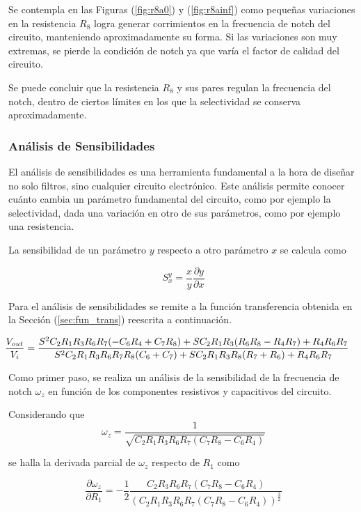 Se contempla en las Figuras (\ref{fig:r8a0}) y (\ref{fig:r8ainf}) como pequeñas variaciones en la resistencia $R_8$ logra generar corrimientos en la frecuencia de notch del circuito, manteniendo aproximadamente su forma. Si las variaciones son muy extremas, se pierde la condición de notch ya que varía el factor de calidad del circuito.

Se puede concluir que la resistencia $R_8$ y sus pares regulan la frecuencia del notch, dentro de ciertos límites en los que la selectividad se conserva aproximadamente.

\subsubsection{Análisis de Sensibilidades}

El análisis de sensibilidades es una herramienta fundamental a la hora de diseñar no solo filtros, sino cualquier circuito electrónico. Este análisis permite conocer cuánto cambia un parámetro fundamental del circuito, como por ejemplo la selectividad, dada una variación en otro de sus parámetros, como por ejemplo una resistencia.

La sensibilidad de un parámetro $y$ respecto a otro parámetro $x$ se calcula como

\begin{equation}
S^y_x = \frac{x}{y} \frac{\partial y}{\partial x}
\end{equation}

Para el análisis de sensibilidades se remite a la función transferencia obtenida en la Sección (\ref{sec:fun_trans}) reescrita a continuación.

\[
\hspace{-0.5cm}
\frac{V_{out}}{V_i} = \frac{S^2 C_2 R_1 R_3 R_6 R_7 (-C_6 R_4 + C_7 R_8) + S C_2 R_1 R_3 (R_6 R_8 - R_4 R_7) + R_4 R_6 R_7}{S^2 C_2 R_1 R_3 R_6 R_7 R_8 (C_6 + C_7)+S C_2 R_1 R_3 R_8 (R_7 + R_6) + R_4 R_6 R_7}
\]

Como primer paso, se realiza un análisis de la sensibilidad de la frecuencia de notch $\omega_z$ en función de los componentes resistivos y capacitivos del circuito.

Considerando que
\begin{equation}
\omega_z = \frac{1}{\sqrt{C_2 R_1 R_3 R_6 R_7 (C_7 R_8 - C_6 R_4)}}
\end{equation}

se halla la derivada parcial de $\omega_z$ respecto de $R_1$ como

\begin{equation}
\frac{\partial \omega_z}{\partial R_1} = -\frac{1}{2} \frac{C_2 R_3 R_6 R_7 (C_7 R_8 - C_6 R_4)}{(C_2 R_1 R_3 R_6 R_7 (C_7 R_8 - C_6 R_4))^{\frac{3}{2}}}
\end{equation}

